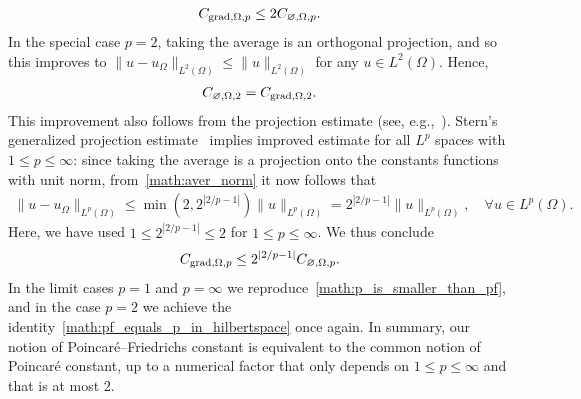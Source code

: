 \documentclass[10pt,a4paper]{article}
\begin{document}
\begin{align}\label{math:p_is_smaller_than_pf}
    C_{\operatorname{grad},\Omega,p} \leq 2 C_{\varnothing,\Omega,p}.
\end{align}
In the special case $p=2$, taking the average is an orthogonal projection, 
and so this improves to $\| u - u_\Omega \|_{L^{2}(\Omega)} \leq \| u \|_{L^{2}(\Omega)}$ for any $u \in L^{2}(\Omega)$. 
Hence,
\begin{align}\label{math:pf_equals_p_in_hilbertspace}
    C_{\varnothing,\Omega,2} = C_{\operatorname{grad},\Omega,2}. 
\end{align}
This improvement also follows from the projection estimate (see, e.g.,~\cite{xu2003some}).
Stern's generalized projection estimate~\cite[Theorem~4.1,Remark~5.1]{stern2015banach} implies improved estimate for all $L^{p}$ spaces with $1 \leq p \leq \infty$:
since taking the average is a projection onto the constants functions with unit norm, from~\eqref{math:aver_norm} it now follows that 
\begin{align*}
    \| u - u_\Omega \|_{L^{p}(\Omega)}
    \leq 
    \min\left( 2, 2^{|2/p-1|} \right)
    \| u \|_{L^{p}(\Omega)}
    = 
    2^{|2/p-1|} 
    \| u \|_{L^{p}(\Omega)}
    ,
    \quad 
    \forall 
    u \in L^{p}(\Omega)
    .
\end{align*}
Here, we have used $1 \leq 2^{|2/p-1|} \leq 2$ for $1 \leq p \leq \infty$.
We thus conclude 
\begin{align}\label{math:p_vs_pf}
    C_{\operatorname{grad},\Omega,p} \leq 2^{|2/p-1|} C_{\varnothing,\Omega,p}.
\end{align}
In the limit cases $p = 1$ and $p = \infty$ we reproduce~\eqref{math:p_is_smaller_than_pf}, 
and in the case $p = 2$ we achieve the identity~\eqref{math:pf_equals_p_in_hilbertspace} once again.
In summary, our notion of Poincar\'e--Friedrichs constant is equivalent to the common notion of Poincar\'e constant, up to a numerical factor that only depends on $1 \leq p \leq \infty$ and that is at most $2$.
\end{document}
